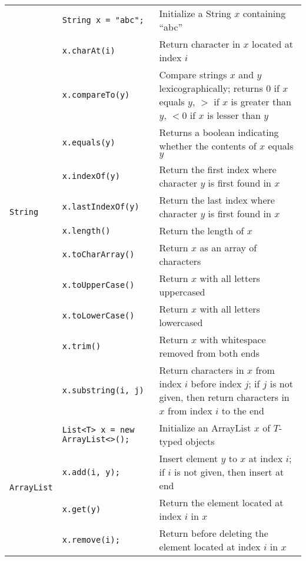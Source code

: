 \documentclass{article}
\begin{document}
\begin{center}
\begin{tabularx}{\textwidth}{llX}
\multirow{12}{*}[-1.0em]{\lstinline|String|} & \lstinline|String x = "abc";| & Initialize a String \(x\) containing \enquote{abc}\\
& \lstinline|x.charAt(i)| & Return character in \(x\) located at index \(i\)\\
& \lstinline|x.compareTo(y)| & Compare strings \(x\) and \(y\) lexicographically; returns \(0\) if \(x\) equals \(y\), \(>\) if \(x\) is greater than \(y\), \(<0\) if \(x\) is lesser than \(y\)\\
& \lstinline|x.equals(y)| & Returns a boolean indicating whether the contents of \(x\) equals \(y\)\\
& \lstinline|x.indexOf(y)| & Return the first index where character \(y\) is first found in \(x\)\\
& \lstinline|x.lastIndexOf(y)| & Return the last index where character \(y\) is first found in \(x\)\\
& \lstinline|x.length()| & Return the length of \(x\)\\
& \lstinline|x.toCharArray()| & Return \(x\) as an array of characters\\
& \lstinline|x.toUpperCase()| & Return \(x\) with all letters uppercased\\
& \lstinline|x.toLowerCase()| & Return \(x\) with all letters lowercased\\
& \lstinline|x.trim()| & Return \(x\) with whitespace removed from both ends\\
& \lstinline|x.substring(i, j)| & Return characters in \(x\) from index \(i\) before index \(j\); if \(j\) is not given, then return characters in \(x\) from index \(i\) to the end\\\midrule

\multirow{4}{*}{\lstinline|ArrayList|} & \lstinline|List<T> x = new ArrayList<>();| & Initialize an ArrayList \(x\) of \(T\)-typed objects\\
& \lstinline|x.add(i, y);| & Insert element \(y\) to \(x\) at index \(i\); if \(i\) is not given, then insert at end\\
& \lstinline|x.get(y)| & Return the element located at index \(i\) in \(x\) \\
& \lstinline|x.remove(i);| & Return before deleting the element located at index \(i\) in \(x\)\\\midrule


\end{tabularx}
\end{center}
\end{document}
